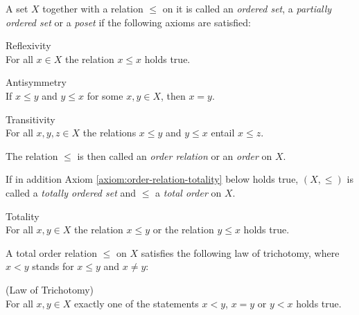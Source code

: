 \begin{definition}
  A set $X$ together with a relation $\leq$ on it is called an \emph{ordered set}, 
  a \emph{partially ordered set} or a \emph{poset} if the following axioms  
  are satisfied: 
  \begin{axiomlist}[O]
  \item\label{axiom:order-relation-reflexivity} \textup{\sffamily Reflexivity}\\
     For all $x\in X$ the relation $x \leq x$ holds true. 
  \item\label{axiom:order-relation-antisymmetry} \textup{\sffamily Antisymmetry}\\
     If $x \leq y$ and $y \leq x$ for some $x,y\in X$, then $x =y$. 
  \item\label{axiom:order-relation-transitivity} \textup{\sffamily Transitivity}\\
     For all $x,y,z \in X$ the relations $x\leq y$ and $y \leq x$ 
     entail $x\leq z$.  
  \end{axiomlist}
  The relation $\leq$ is then called an \emph{order relation} or an \emph{order} on $X$.   
 
  If in addition Axiom \ref{axiom:order-relation-totality} below
  holds true, $(X,\leq)$ is called a \emph{totally ordered set} and $\leq$ a \emph{total order} 
  on $X$.  
  \begin{axiomlist}[O]
  \setcounter{enumi}{3}
  \item\label{axiom:order-relation-totality} \textup{\sffamily Totality}\\
     For all $x,y\in X$ the relation $x \leq y$ or the relation $y \leq x$ holds true.
  \end{axiomlist}

  A total order relation $\leq$ on $X$ satisfies the following law of trichotomy, where $x < y$ 
  stands for $x \leq y$ and $ x \neq y$:
  \begin{axiomlist}[O]
  \setcounter{enumi}{4}
  \item[]\hspace{-10mm}\textup{({\sffamily Law of Trichotomy})}\\
     For all $x,y\in X$ exactly one of the statements $x < y$, $x=y$ or $y <x$ holds true. 
  \end{axiomlist}
\end{definition}

